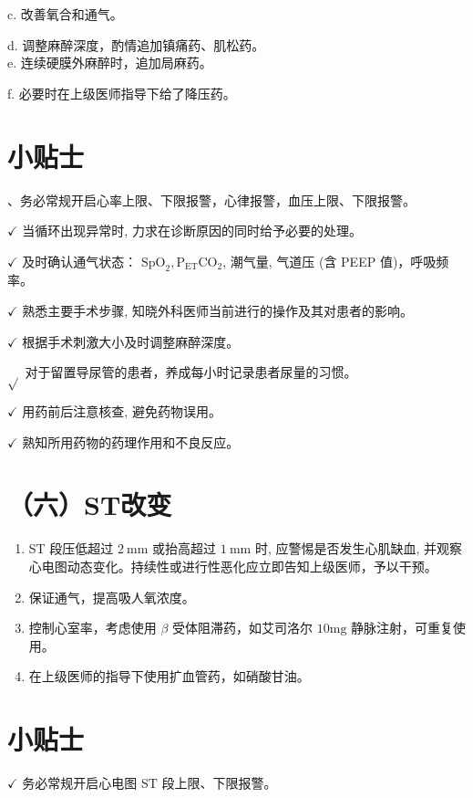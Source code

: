 \documentclass[10pt]{article}
\begin{document}
c. 改善氧合和通气。

d. 调整麻醉深度，酌情追加镇痛药、肌松药。\\
e. 连续硬膜外麻醉时，追加局麻药。

f. 必要时在上级医师指导下给了降压药。

\section*{小贴士}
、务必常规开启心率上限、下限报警，心律报警，血压上限、下限报警。

$\checkmark$ 当循环出现异常时, 力求在诊断原因的同时给予必要的处理。

$\checkmark$ 及时确认通气状态： $\mathrm{SpO}_{2}, \mathrm{P}_{\mathrm{ET}} \mathrm{CO}_{2}$, 潮气量, 气道压 (含 PEEP 值)，呼吸频率。

$\checkmark$ 熟悉主要手术步骤, 知晓外科医师当前进行的操作及其对患者的影响。

$\checkmark$ 根据手术刺激大小及时调整麻醉深度。

$\sqrt{ }$ 对于留置导尿管的患者，养成每小时记录患者尿量的习惯。

$\checkmark$ 用药前后注意核查, 避免药物误用。

$\checkmark$ 熟知所用药物的药理作用和不良反应。

\section*{（六）ST改变}
\begin{enumerate}
  \item ST 段压低超过 $2 \mathrm{~mm}$ 或抬高超过 $1 \mathrm{~mm}$ 时, 应警惕是否发生心肌缺血, 并观察心电图动态变化。持续性或进行性恶化应立即告知上级医师，予以干预。

  \item 保证通气，提高吸人氧浓度。

  \item 控制心室率，考虑使用 $\beta$ 受体阻滞药，如艾司洛尔 $10 \mathrm{mg}$ 静脉注射，可重复使用。

  \item 在上级医师的指导下使用扩血管药，如硝酸甘油。

\end{enumerate}

\section*{小贴士}
$\checkmark$ 务必常规开启心电图 ST 段上限、下限报警。
\end{document}
